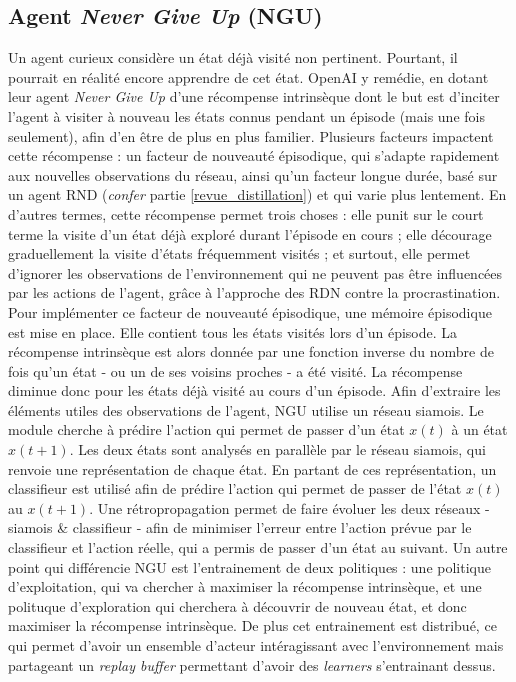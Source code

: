 \documentclass[a4paper,12pt]{report}
\begin{document}
\subsection{Agent \textit{Never Give Up} \cite{ngu} (NGU)}
\indent Un agent curieux considère un état déjà visité non pertinent. Pourtant, il pourrait en réalité encore apprendre de cet état.
\newline \indent OpenAI y remédie, en dotant leur agent \textit{Never Give Up} d’une récompense intrinsèque dont le but est d'inciter l’agent à visiter à nouveau les états connus pendant un épisode (mais une fois seulement), afin d'en être de plus en plus familier.
\newline
\newline \indent Plusieurs facteurs impactent cette récompense : un facteur de nouveauté épisodique, qui s’adapte rapidement aux nouvelles observations du réseau, ainsi qu'un facteur longue durée, basé sur un agent RND (\textit{confer} partie \ref{revue_distillation}) et qui varie plus lentement. En d’autres termes, cette récompense permet trois choses : elle punit sur le court terme la visite d’un état déjà exploré durant l'épisode en cours ; elle décourage graduellement la visite d’états fréquemment visités ; et surtout, elle permet d'ignorer les observations de l’environnement qui ne peuvent pas être influencées par les actions de l’agent, grâce à l'approche des RDN contre la procrastination.
\newline \indent  Pour implémenter ce facteur de nouveauté épisodique, une mémoire épisodique est mise en place. Elle contient tous les états visités lors d'un épisode. La récompense intrinsèque est alors donnée par une fonction inverse du nombre de fois qu’un état - ou un de ses voisins proches - a été visité. La récompense diminue donc pour les états déjà visité au cours d'un épisode.
\newline
\newline \indent Afin d'extraire les éléments utiles des observations de l’agent, NGU utilise un réseau siamois. Le module cherche à prédire l’action qui permet de passer d’un état $x(t)$ à un état $x(t+1)$. Les deux états sont analysés en parallèle par le réseau siamois, qui renvoie une représentation de chaque état.
\newline En partant de ces représentation, un classifieur est utilisé afin de prédire l’action qui permet de passer de l’état $x(t)$ au $x(t+1)$. Une rétropropagation permet de faire évoluer les deux réseaux - siamois \& classifieur - afin de minimiser l’erreur entre l’action prévue par le classifieur et l’action réelle, qui a permis de passer d'un état au suivant.
\newline \indent Un autre point qui différencie NGU est l'entrainement de deux politiques : une politique d'exploitation, qui va chercher à maximiser la récompense intrinsèque, et une polituque d'exploration qui cherchera à découvrir de nouveau état, et donc maximiser la récompense intrinsèque. De plus cet entrainement est distribué, ce qui permet d'avoir un ensemble d'acteur intéragissant avec l'environnement mais partageant un \textit{replay buffer} permettant d'avoir des \textit{learners} s'entrainant dessus.
\end{document}
